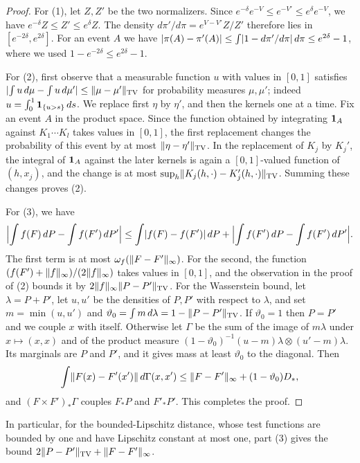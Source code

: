 \begin{proof}
For (1), let $Z,Z'$ be the two normalizers. Since $e^{-\delta}e^{-V}\le e^{-V'}\le e^{\delta}e^{-V}$, we have $e^{-\delta}Z\le Z'\le e^\delta Z$. The density $d\pi'/d\pi=e^{V-V'}Z/Z'$ therefore lies in $[e^{-2\delta},e^{2\delta}]$. For an event $A$ we have $\lvert \pi(A)-\pi'(A)\rvert\le\int\lvert 1-d\pi'/d\pi\rvert\,d\pi\le e^{2\delta}-1$, where we used $1-e^{-2\delta}\le e^{2\delta}-1$.

For (2), first observe that a measurable function $u$ with values in $[0,1]$ satisfies $\lvert \int u\,d\mu-\int u\,d\mu'\rvert\le\lVert \mu-\mu'\rVert_{\operatorname{TV}}$ for probability measures $\mu,\mu'$; indeed $u=\int_0^1\mathbf 1_{\{u>s\}}\,ds$. We replace first $\eta$ by $\eta'$, and then the kernels one at a time. Fix an event $A$ in the product space. Since the function obtained by integrating $\mathbf 1_A$ against $K_1\cdots K_l$ takes values in $[0,1]$, the first replacement changes the probability of this event by at most $\lVert \eta-\eta'\rVert_{\operatorname{TV}}$. In the replacement of $K_j$ by $K_j'$, the integral of $\mathbf 1_A$ against the later kernels is again a $[0,1]$-valued function of $(h,x_j)$, and the change is at most $\sup_h\lVert K_j(h,\cdot)-K_j'(h,\cdot)\rVert_{\operatorname{TV}}$. Summing these changes proves (2).

For (3), we have
\[
 \Bigl\lvert\int f(F)\,dP-\int f(F')\,dP'\Bigr\rvert
 \le\int\lvert f(F)-f(F')\rvert\,dP+\Bigl\lvert\int f(F')\,dP-\int f(F')\,dP'\Bigr\rvert .
\]
The first term is at most $\omega_f(\lVert F-F'\rVert_\infty)$. For the second, the function $(f(F')+\lVert f\rVert_\infty)/(2\lVert f\rVert_\infty)$ takes values in $[0,1]$, and the observation in the proof of (2) bounds it by $2\lVert f\rVert_\infty\lVert P-P'\rVert_{\operatorname{TV}}$. For the Wasserstein bound, let $\lambda=P+P'$, let $u,u'$ be the densities of $P,P'$ with respect to $\lambda$, and set $m=\min(u,u')$ and $\vartheta_0=\int m\,d\lambda=1-\lVert P-P'\rVert_{\operatorname{TV}}$. If $\vartheta_0=1$ then $P=P'$ and we couple $x$ with itself. Otherwise let $\Gamma$ be the sum of the image of $m\lambda$ under $x\mapsto(x,x)$ and of the product measure $(1-\vartheta_0)^{-1}(u-m)\lambda\otimes(u'-m)\lambda$. Its marginals are $P$ and $P'$, and it gives mass at least $\vartheta_0$ to the diagonal. Then
\[
 \int\lVert F(x)-F'(x')\rVert\,d\Gamma(x,x')\le\lVert F-F'\rVert_\infty+(1-\vartheta_0)D_*,
\]
and $(F\times F')_*\Gamma$ couples $F_*P$ and $F'_*P'$. This completes the proof.
\end{proof}

In particular, for the bounded-Lipschitz distance, whose test functions are bounded by one and have Lipschitz constant at most one, part (3) gives the bound $2\lVert P-P'\rVert_{\operatorname{TV}}+\lVert F-F'\rVert_\infty$.

